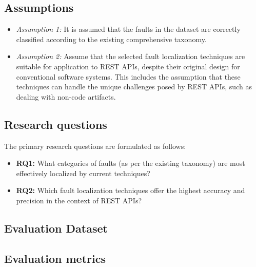 \documentclass[conference]{IEEEtran}
\newcommand{\todo}[1]{\textcolor{red}{{\bfseries [[#1]]}}}
\begin{document}

\subsection{Assumptions}
    \begin{itemize}
        \item \textit{Assumption 1:} It is assumed that the faults in the dataset are correctly classified according to the existing comprehensive taxonomy.
        \item \textit{Assumption 2:} Assume that the selected fault localization techniques are suitable for application to REST APIs, despite their original design for conventional software systems. This includes the assumption that these techniques can handle the unique challenges posed by REST APIs, such as dealing with non-code artifacts.
    \end{itemize}


\subsection{Research questions}
    The primary research questions are formulated as follows:
    \begin{itemize}
        \item \textbf{RQ1:} What categories of faults (as per the existing taxonomy) are most effectively localized by current techniques?
        \item \textbf{RQ2:} Which fault localization techniques offer the highest accuracy and precision in the context of REST APIs?
    \end{itemize}

\subsection{Evaluation Dataset}

\subsection{Evaluation metrics}

\end{document}
